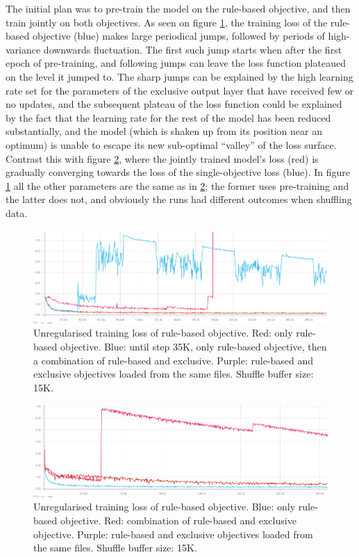 The initial plan was to pre-train the model on the rule-based objective, and then train jointly on both objectives.
As seen on figure \ref{pretrain}, the training loss of the rule-based objective (blue) makes large periodical jumps, followed by periods of high-variance downwards fluctuation.
The first such jump starts when after the first epoch of pre-training, and following jumps can leave the loss function plateaued on the level it jumped to.
The sharp jumps can be explained by the high learning rate set for the parameters of the exclusive output layer that have received few or no updates, and the subsequent plateau of the loss function could be explained by the fact that the learning rate for the rest of the model has been reduced substantially, and the model (which is shaken up from its position near an optimum) is unable to escape its new sub-optimal ``valley'' of the loss surface.
Contrast this with figure \ref{nopretrain}, where the jointly trained model's loss (red) is gradually converging towards the loss of the single-objective loss (blue).
In figure \ref{pretrain} all the other parameters are the same as in \ref{nopretrain}; the former uses pre-training and the latter does not, and obviously the runs had different outcomes when shuffling data.

\begin{figure}
  \includegraphics[width=\linewidth]{figures/multiobj/pretrain}
  \caption{Unregularised training loss of rule-based objective. Red: only rule-based objective. Blue: until step 35K, only rule-based objective, then a combination of rule-based and exclusive. Purple: rule-based and exclusive objectives loaded from the same files. Shuffle buffer size: 15K.}
  \label{pretrain}
\end{figure}

\begin{figure}
  \includegraphics[width=\linewidth]{figures/multiobj/nopretrain}
  \caption{Unregularised training loss of rule-based objective. Blue: only rule-based objective. Red: combination of rule-based and exclusive objective. Purple: rule-based and exclusive objectives loaded from the same files. Shuffle buffer size: 15K.}
  \label{nopretrain}
\end{figure}

